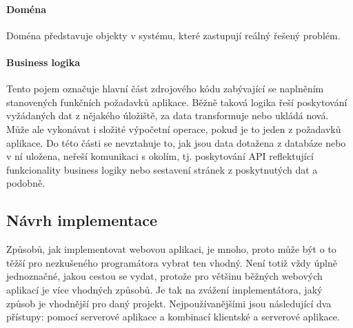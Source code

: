 		\paragraph{Doména}

		Doména představuje objekty v systému, které zastupují reálný řešený problém.

		\paragraph{Business logika}

		Tento pojem označuje hlavní část zdrojového kódu zabývající se naplněním stanovených funkčních požadavků aplikace.
		Běžně taková logika řeší poskytování vyžádaných dat z nějakého úložiště, za data transformuje nebo ukládá nová.
		Může ale vykonávat i složité výpočetní operace, pokud je to jeden z požadavků aplikace.
		Do této části se nevztahuje to, jak jsou data dotažena z databáze nebo v ní uložena, neřeší komunikaci
		s okolím, tj. poskytování \ac{API} reflektující funkcionality business logiky nebo sestavení stránek z poskytnutých
		dat a podobně.

	\subsection{Návrh implementace}

	Způsobů, jak implementovat webovou aplikaci, je mnoho, proto může být o to těžší pro nezkušeného programátora vybrat ten vhodný.
	Není totiž vždy úplně jednoznačné, jakou cestou se vydat, protože pro většinu běžných webových aplikací je více
	vhodných způsobů.
	Je tak na zvážení implementátora, jaký způsob je vhodnější pro daný projekt.
	Nejpoužívanějšími jsou následující dva přístupy: pomocí serverové aplikace a kombinací klientské a serverové aplikace.


